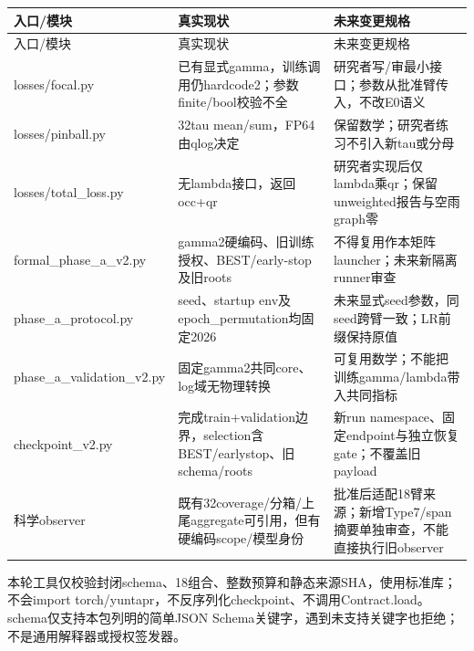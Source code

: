 \documentclass[UTF8,fontset=fandol,10pt]{ctexart}
\begin{document}
\begingroup\small\setlength{\tabcolsep}{3pt}\renewcommand{\arraystretch}{1.12}
\begin{longtable}{>{\raggedright\arraybackslash}p{\dimexpr(\linewidth-6\tabcolsep)/3\relax}>{\raggedright\arraybackslash}p{\dimexpr(\linewidth-6\tabcolsep)/3\relax}>{\raggedright\arraybackslash}p{\dimexpr(\linewidth-6\tabcolsep)/3\relax}}
\toprule
入口/\allowbreak{}模块 & 真实现状 & 未来变更规格 \\
\midrule\endfirsthead
入口/\allowbreak{}模块 & 真实现状 & 未来变更规格 \\
\midrule\endhead
losses/\allowbreak{}focal.py & 已有显式gamma，训练调用仍hardcode2；参数finite/\allowbreak{}bool校验不全 & 研究者写/\allowbreak{}审最小接口；参数从批准臂传入，不改E0语义 \\
losses/\allowbreak{}pinball.py & 32tau mean/\allowbreak{}sum，FP64由qlog决定 & 保留数学；研究者练习不引入新tau或分母 \\
losses/\allowbreak{}total\_\allowbreak{}loss.py & 无lambda接口，返回occ+qr & 研究者实现后仅lambda乘qr；保留unweighted报告与空雨graph零 \\
formal\_\allowbreak{}phase\_\allowbreak{}a\_\allowbreak{}v2.py & gamma2硬编码、旧训练授权、BEST/\allowbreak{}early-stop及旧roots & 不得复用作本矩阵launcher；未来新隔离runner审查 \\
phase\_\allowbreak{}a\_\allowbreak{}protocol.py & seed、startup env及epoch\_\allowbreak{}permutation均固定2026 & 未来显式seed参数，同seed跨臂一致；LR前缀保持原值 \\
phase\_\allowbreak{}a\_\allowbreak{}validation\_\allowbreak{}v2.py & 固定gamma2共同core、log域无物理转换 & 可复用数学；不能把训练gamma/\allowbreak{}lambda带入共同指标 \\
checkpoint\_\allowbreak{}v2.py & 完成train+validation边界，selection含BEST/\allowbreak{}earlystop、旧schema/\allowbreak{}roots & 新run namespace、固定endpoint与独立恢复gate；不覆盖旧payload \\
科学observer & 既有32coverage/\allowbreak{}分箱/\allowbreak{}上尾aggregate可引用，但有硬编码scope/\allowbreak{}模型身份 & 批准后适配18臂来源；新增Type7/\allowbreak{}span摘要单独审查，不能直接执行旧observer \\
\bottomrule\end{longtable}\endgroup

本轮工具仅校验封闭schema、18组合、整数预算和静态来源SHA，使用标准库；不会import torch/\allowbreak{}yuntapr，不反序列化checkpoint、不调用Contract.load。schema仅支持本包列明的简单JSON Schema关键字，遇到未支持关键字也拒绝；不是通用解释器或授权签发器。
\end{document}
